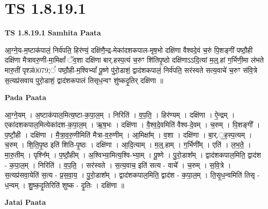 \documentclass[17pt]{extarticle}
\begin{document}
\section{ TS 1.8.19.1 }

\textbf{TS 1.8.19.1 } \newline
\textbf{Samhita Paata} \newline

आ॒ग्ने॒य-म॒ष्टाक॑पालं॒ निर्व॑पति॒ हिर॑ण्यं॒ दक्षि॑णै॒न्द्र-मेका॑दशकपाल-मृष॒भो दक्षि॑णा वैश्वदे॒वं च॒रुं पि॒शङ्गी॑ पष्ठौ॒ही दक्षि॑णा मैत्रावरु॒णी-मा॒मिक्षां᳚ ॅव॒शा दक्षि॑णा बार्.हस्प॒त्यं च॒रुꣳ शि॑तिपृ॒ष्ठो दक्षि॑णाऽऽदि॒त्यां म॒ल्॒.हां ग॒र्भिणी॒मा ल॑भते मारु॒तीं पृश्ञ॑0079;ं॑ पष्ठौ॒ही-म॒श्विभ्यां᳚ पू॒ष्णे पु॑रो॒डाशं॒ द्वाद॑शकपालं॒ निर्व॑पति॒ सर॑स्वते सत्य॒वाचे॑ च॒रुꣳ स॑वि॒त्रे स॒त्यप्र॑सवाय पुरो॒डाशं॒ द्वाद॑शकपालं तिसृध॒न्वꣳ शु॑ष्कदृ॒तिर् दक्षि॑णा ॥ \newline

\textbf{Pada Paata} \newline

आ॒ग्ने॒यम् । अ॒ष्टाक॑पाल॒मित्य॒ष्टा-क॒पा॒ल॒म् । निरिति॑ । व॒प॒ति॒ । हिर॑ण्यम् । दक्षि॑णा । ऐ॒न्द्रम् । एका॑दशकपाल॒मित्येका॑दश-क॒पा॒ल॒म् । ऋ॒ष॒भः । दक्षि॑णा । वै॒श्व॒दे॒वमिति॑ वैश्व-दे॒वम् । च॒रुम् । पि॒शङ्गी᳚ । प॒ष्टौ॒ही । दक्षि॑णा । मै॒त्रा॒व॒रु॒णीमिति॑ मैत्रा-व॒रु॒णीम् । आ॒मिक्षा᳚म् । व॒शा । दक्षि॑णा । बा॒र्.॒ह॒स्प॒त्यम् । च॒रुम् । शि॒ति॒पृ॒ष्ठ इति॑ शिति-पृ॒ष्ठः । दक्षि॑णा । आ॒दि॒त्याम् । म॒ल्॒.हाम् । ग॒र्भिणी᳚म् । एति॑ । ल॒भ॒ते॒ । मा॒रु॒तीम् । पृश्नि᳚म् । प॒ष्ठौ॒हीम् । अ॒श्विभ्या॒मित्य॒श्वि-भ्या॒म् । पू॒ष्णे । पु॒रो॒डाश᳚म् । द्वाद॑शकपाल॒मिति॒ द्वाद॑श - क॒पा॒ल॒म् । निरिति॑ । व॒प॒ति॒ । सर॑स्वते । स॒त्य॒वाच॒ इति॑ सत्य - वाचे᳚ । च॒रुम् । स॒वि॒त्रे । स॒त्यप्र॑सवा॒येति॑ स॒त्य - प्र॒स॒वा॒य॒ । पु॒रो॒डाश᳚म् । द्वाद॑शकपाल॒मिति॒ द्वाद॑श - क॒पा॒ल॒म् । ति॒सृ॒ध॒न्वमिति॑ तिसृ - ध॒न्वम् । शु॒ष्क॒दृ॒तिरिति॑ शुष्क - दृ॒तिः । दक्षि॑णा ॥  \newline



\textbf{Jatai Paata} \newline
\end{document}
